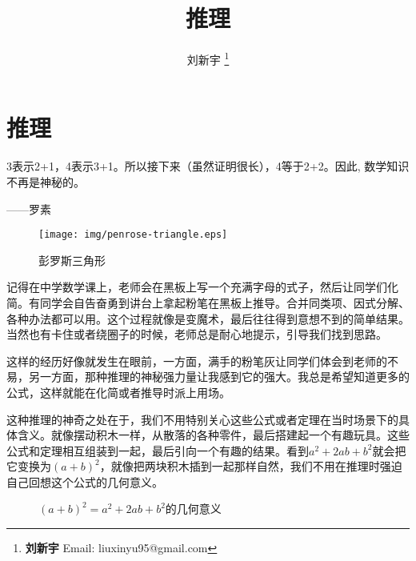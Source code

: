 \documentclass{article}
\begin{document}
\title{推理}

\author{刘新宇
\thanks{{\bfseries 刘新宇} \newline
  Email: liuxinyu95@gmail.com \newline}
  }

\maketitle
\fi


\ifx\wholebook\relax
\chapter{推理}
\fi

\epigraph{3表示2+1，4表示3+1。所以接下来（虽然证明很长），4等于2+2。因此, 数学知识不再是神秘的。}{——罗素}


\begin{wrapfigure}{R}{0.4\textwidth}
 \centering
 \texttt{[image: img/penrose-triangle.eps]}
 \captionsetup{labelformat=empty}
 \caption{彭罗斯三角形}
 \label{fig:Penrose-triangle}
\end{wrapfigure}

记得在中学数学课上，老师会在黑板上写一个充满字母的式子，然后让同学们化简。有同学会自告奋勇到讲台上拿起粉笔在黑板上推导。合并同类项、因式分解、各种办法都可以用。这个过程就像是变魔术，最后往往得到意想不到的简单结果。当然也有卡住或者绕圈子的时候，老师总是耐心地提示，引导我们找到思路。

这样的经历好像就发生在眼前，一方面，满手的粉笔灰让同学们体会到老师的不易，另一方面，那种推理的神秘强力量让我感到它的强大。我总是希望知道更多的公式，这样就能在化简或者推导时派上用场。

这种推理的神奇之处在于，我们不用特别关心这些公式或者定理在当时场景下的具体含义。就像摆动积木一样，从散落的各种零件，最后搭建起一个有趣玩具。这些公式和定理相互组装到一起，最后引向一个有趣的结果。看到$a^2 + 2ab + b^2$就会把它变换为$(a+b)^2$，就像把两块积木插到一起那样自然，我们不用在推理时强迫自己回想这个公式的几何意义。

\begin{figure}[htbp]
\centering
{}
\caption{$(a + b)^2 = a^2 + 2ab + b^2$的几何意义}
\end{figure}
\end{document}
